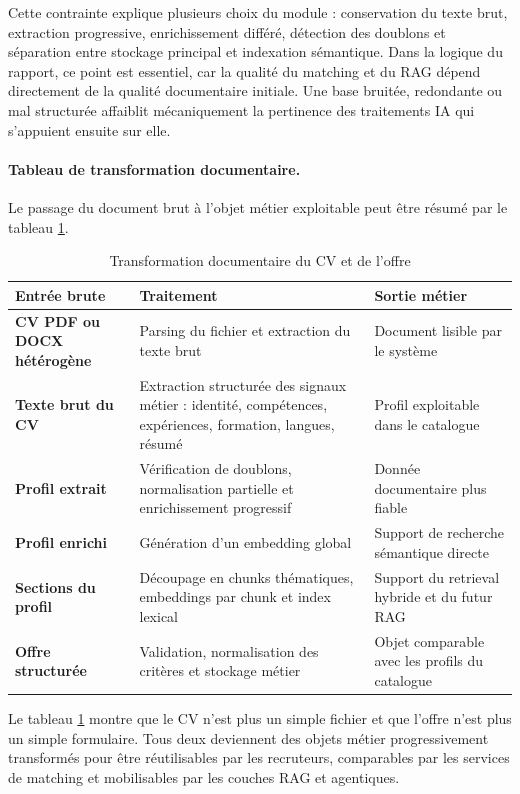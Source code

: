 Cette contrainte explique plusieurs choix du module : conservation du texte brut, extraction progressive, enrichissement différé, détection des doublons et séparation entre stockage principal et indexation sémantique. Dans la logique du rapport, ce point est essentiel, car la qualité du matching et du RAG dépend directement de la qualité documentaire initiale. Une base bruitée, redondante ou mal structurée affaiblit mécaniquement la pertinence des traitements IA qui s'appuient ensuite sur elle.

\paragraph{Tableau de transformation documentaire.}
Le passage du document brut à l'objet métier exploitable peut être résumé par le tableau \ref{tab:document-transformation}.

\begin{table}[H]
  \centering
  \caption{\label{tab:document-transformation}Transformation documentaire du CV et de l'offre}
  \begin{tabularx}{\textwidth}{>{\bfseries}p{3cm}X X}
    \toprule
    Entrée brute & Traitement & Sortie métier \\
    \midrule
    CV PDF ou DOCX hétérogène & Parsing du fichier et extraction du texte brut & Document lisible par le système \\
    Texte brut du CV & Extraction structurée des signaux métier : identité, compétences, expériences, formation, langues, résumé & Profil exploitable dans le catalogue \\
    Profil extrait & Vérification de doublons, normalisation partielle et enrichissement progressif & Donnée documentaire plus fiable \\
    Profil enrichi & Génération d'un embedding global & Support de recherche sémantique directe \\
    Sections du profil & Découpage en chunks thématiques, embeddings par chunk et index lexical & Support du retrieval hybride et du futur RAG \\
    Offre structurée & Validation, normalisation des critères et stockage métier & Objet comparable avec les profils du catalogue \\
    \bottomrule
  \end{tabularx}
\end{table}

Le tableau \ref{tab:document-transformation} montre que le CV n'est plus un simple fichier et que l'offre n'est plus un simple formulaire. Tous deux deviennent des objets métier progressivement transformés pour être réutilisables par les recruteurs, comparables par les services de matching et mobilisables par les couches RAG et agentiques.


